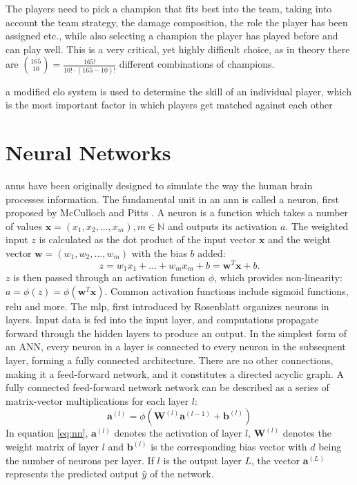 \documentclass[12pt, a4paper, headinclude, twoside, plainheadsepline, open=right, numbers=noenddot, hidelinks, toc=listof, toc=bibliography]{scrreprt}
\begin{document}
The players need to pick a champion that fits best into the team, taking into account the team strategy, the damage composition, the role the player has been assigned etc., while also selecting a champion the player has played before and can play well.
This is a very critical, yet highly difficult choice, as in theory there are $\binom{165}{10} = \frac{165!}{10! \cdot (165-10)!}$ different combinations of champions.




a modified elo system  is used to determine the skill of an individual player, which is the most important factor in which players get matched against each other


\section{Neural Networks}
\label{sec:nn}

\Acp{ann} have been originally designed to simulate the way the human brain processes information.
The fundamental unit in an \ac{ann} is called a neuron, first proposed by McCulloch and Pitts  \cite{mccullochLogicalCalculusIdeas1943}.
A neuron is a function which takes a number of values $ \mathbf{x} = (x_1, x_2, ... , x_m), m \in \mathbb{N}$ and outputs its activation $a$.
The weighted input $z$ is calculated as the dot product of the input vector $\mathbf{x}$ and the weight vector $\mathbf{w} = (w_1, w_2, ... , w_m)$ with the bias $b$ added:
\begin{equation}
z = w_1 x_1 + ... + w_m x_m + b = \mathbf{w}^T \mathbf{x} + b.
\end{equation}
$z$ is then passed through an activation function $\phi$, which provides non-linearity:
$a = \phi(z) = \phi(\mathbf{w}^T \mathbf{x})$.
Common activation functions include sigmoid functions, \ac{relu} and more.
The \ac{mlp}, first introduced by Rosenblatt \cite{rosenblattPerceptronProbabilisticModel1958a} organizes neurons in layers.
Input data is fed into the input layer, and computations propagate forward through the hidden layers to produce an output.
In the simplest form of an ANN, every neuron in a layer is connected to every neuron in the subsequent layer, forming a fully connected architecture.
There are no other connections, making it a feed-forward network, and it constitutes a directed acyclic graph.
A fully connected feed-forward network network can be described as a series of matrix-vector multiplications for each layer $l$:
\begin{equation}
\label{eq:nn}
\mathbf{a}^{(l)} = \phi (\mathbf{W}^{(l)} \mathbf{a}^{(l-1)} + \mathbf{b}^{(l)})
\end{equation}
In equation \ref{eq:nn}, $\mathbf{a}^{(l)}$ denotes the activation of layer $l$, $\mathbf{W}^{(l)}$ denotes the weight matrix of layer $l$ and $\mathbf{b}^{(l)}$ is the corresponding bias vector with $d$ being the number of neurons per layer.
If $l$ is the output layer $L$, the vector $\mathbf{a}^{(L)}$ represents the predicted output $\hat{y}$ of the network.
\end{document}
